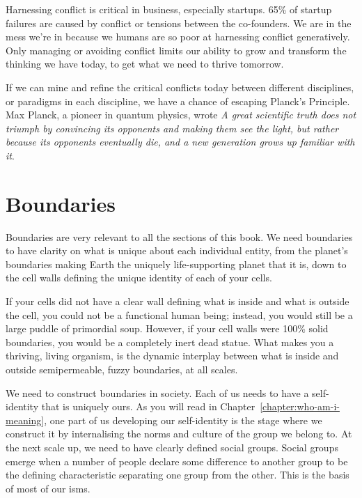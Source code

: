 Harnessing conflict is critical in business, especially startups. 65\% of startup failures are caused by conflict or tensions between the co-founders\cite{wasserman-founders-dilemmas}. We are in the mess we’re in because we humans are so poor at harnessing conflict generatively. Only managing or avoiding conflict limits our ability to grow and transform the thinking we have today, to get what we need to thrive tomorrow.


If we can mine and refine the critical conflicts today between different disciplines, or paradigms in each discipline, we have a chance of escaping Planck's Principle. Max Planck, a pioneer in quantum physics, wrote \emph{A great scientific truth does not triumph by convincing its opponents and making them see the light, but rather because its opponents eventually die, and a new generation grows up familiar with it}.






\section{Boundaries}
Boundaries are very relevant to all the sections of this book. We need boundaries to have clarity on what is unique about each individual entity, from the planet’s boundaries making Earth the uniquely life-supporting planet that it is, down to the cell walls defining the unique identity of each of your cells.


If your cells did not have a clear wall defining what is inside and what is outside the cell, you could not be a functional human being; instead, you would still be a large puddle of primordial soup. However, if your cell walls were 100\% solid boundaries, you would be a completely inert dead statue. What makes you a thriving, living organism, is the dynamic interplay between what is inside and outside semipermeable, fuzzy boundaries, at all scales.


We need to construct boundaries in society. Each of us needs to have a self-identity that is uniquely ours. As you will read in Chapter~\ref{chapter:who-am-i-meaning}, one part of us developing our self-identity is the stage where we construct it by internalising the norms and culture of the group we belong to. At the next scale up, we need to have clearly defined social groups. Social groups emerge when a number of people declare some difference to another group to be the defining characteristic separating one group from the other. This is the basis of most of our isms.


